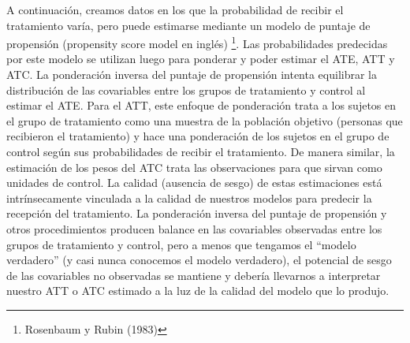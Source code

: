 \documentclass[
]{article}
\begin{document}
A continuación, creamos datos en los que la probabilidad de recibir el
tratamiento varía, pero puede estimarse mediante un modelo de puntaje de
propensión (propensity score model en inglés) \footnote{Rosenbaum y
  Rubin (1983)}. Las probabilidades predecidas por este modelo se
utilizan luego para ponderar y poder estimar el ATE, ATT y ATC. La
ponderación inversa del puntaje de propensión intenta equilibrar la
distribución de las covariables entre los grupos de tratamiento y
control al estimar el ATE. Para el ATT, este enfoque de ponderación
trata a los sujetos en el grupo de tratamiento como una muestra de la
población objetivo (personas que recibieron el tratamiento) y hace una
ponderación de los sujetos en el grupo de control según sus
probabilidades de recibir el tratamiento. De manera similar, la
estimación de los pesos del ATC trata las observaciones para que sirvan
como unidades de control. La calidad (ausencia de sesgo) de estas
estimaciones está intrínsecamente vinculada a la calidad de nuestros
modelos para predecir la recepción del tratamiento. La ponderación
inversa del puntaje de propensión y otros procedimientos producen
balance en las covariables observadas entre los grupos de tratamiento y
control, pero a menos que tengamos el ``modelo verdadero'' (y casi nunca
conocemos el modelo verdadero), el potencial de sesgo de las covariables
no observadas se mantiene y debería llevarnos a interpretar nuestro ATT
o ATC estimado a la luz de la calidad del modelo que lo produjo.
\end{document}
